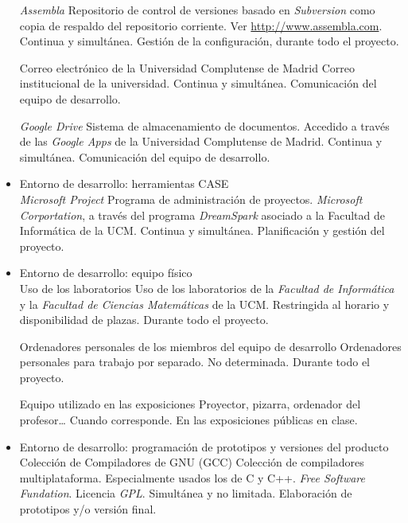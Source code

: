 \begin{itemize}
		{\textit{Assembla}}
		{Repositorio de control de versiones basado en \textit{Subversion} como copia de respaldo del
		repositorio corriente.}
		{Ver \url{http://www.assembla.com}.}
		{Continua y simultánea.}
		{Gestión de la configuración, durante todo el proyecto.}

		{Correo electrónico de la Universidad Complutense de Madrid}
		{Correo institucional de la universidad.}
		{}
		{Continua y simultánea.}
		{Comunicación del equipo de desarrollo.}

		{\textit{Google Drive}}
		{Sistema de almacenamiento de documentos. Accedido a través de las \textit{Google Apps} de la Universidad Complutense de Madrid.}
		{}
		{Continua y simultánea.}
		{Comunicación del equipo de desarrollo.}

	\item Entorno de desarrollo: herramientas CASE \\

		{\textit{Microsoft Project}}
		{Programa de administración de proyectos.}
		{\textit{Microsoft Corportation}, a través del programa \textit{DreamSpark} asociado a la Facultad de Informática de la UCM.}
		{Continua y simultánea.}
		{Planificación y gestión del proyecto.}

	\item Entorno de desarrollo: equipo físico \\

		{Uso de los laboratorios}
		{Uso de los laboratorios de la \textit{Facultad de Informática} y la \textit{Facultad de Ciencias Matemáticas} de la UCM.}
		{}
		{Restringida al horario y disponibilidad de plazas.}
		{Durante todo el proyecto.}

		{Ordenadores personales de los miembros del equipo de desarrollo}
		{Ordenadores personales para trabajo por separado.}
		{}
		{No determinada.}
		{Durante todo el proyecto.}

		{Equipo utilizado en las exposiciones}
		{Proyector, pizarra, ordenador del profesor\ldots}
		{}
		{Cuando corresponde.}
		{En las exposiciones públicas en clase.}

	
	\item Entorno de desarrollo: programación de prototipos y versiones del producto \\
		
		{Colección de Compiladores de GNU (GCC)}
		{Colección de compiladores multiplataforma. Especialmente usados los de C y C++.}
		{\textit{Free Software Fundation}. Licencia \textit{GPL}.}
		{Simultánea y no limitada.}
		{Elaboración de prototipos y/o versión final.}


\end{itemize}
